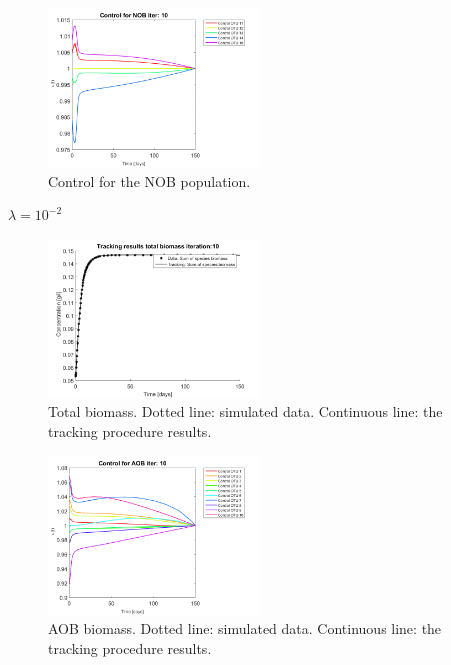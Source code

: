 \documentclass[3p,times]{elsarticle}
\begin{document}
\begin{figure}[h]
	\centering
	\includegraphics[width=0.5\textwidth]{Synthetic_data//lambda_=_e-1//191210_no_noise_Control_NOB_iter_10_plot_1}
	\caption{Control for the NOB population.}
	\label{Control NOB no noise e1}
\end{figure}
\clearpage
\textbf{$\lambda = 10^{-2}$}
\begin{figure}[h]
	\centering
	\includegraphics[width=0.5\textwidth]{Synthetic_data//lambda_=_e-2//191210_no_noise_2_Biomass_iter_10}
	\caption{Total biomass. Dotted line: simulated data. Continuous line: the tracking procedure results.}
	\label{Total Biomass no noise e2}
\end{figure}
\begin{figure}[h]
	\centering
	\includegraphics[width=0.5\textwidth]{Synthetic_data//lambda_=_e-2//191210_no_noise_2_Control_AOB_iter_10_plot_1}
	\caption{AOB biomass. Dotted line: simulated data. Continuous line: the tracking procedure results.}
	\label{AOB no noise e2}
\end{figure}
\end{document}

